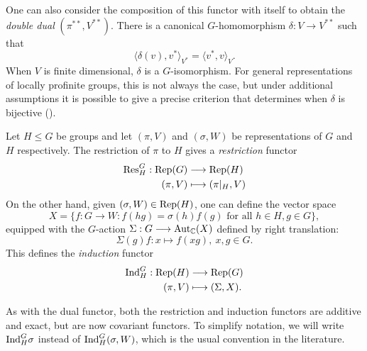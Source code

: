 One can also consider the composition of this functor with itself to obtain the \textit{double dual} $(\pi^{**},V^{**})$. There is a canonical $G$-homomorphism $\delta:V\rightarrow V^{**}$ such that $$\langle\delta(v),v^*\rangle_{V^*}=\langle v^*,v\rangle_{V}.$$
When $V$ is finite dimensional, $\delta$ is a $G$-isomorphism. For general representations of locally profinite groups, this is not always the case, but under additional assumptions it is possible to give a precise criterion that determines when $\delta$ is bijective (\cite[Corollary 2.8, Proposition 2.9]{BH1}).


\begin{defn}\label{def:absresind}
    Let $H\leq G$ be groups and let $(\pi,V)$ and $(\sigma,W)$ be representations of $G$ and $H$ respectively. The restriction of $\pi$ to $H$ gives a \textit{restriction} functor
    \begin{align*}
        \mathrm{Res}_H^G:\mathrm{Rep}(G)&\longrightarrow\mathrm{Rep}(H)\\
        (\pi,V)&\longmapsto(\pi|_H,V)
    \end{align*}
    On the other hand, given $(\sigma,W)\in\mathrm{Rep}(H)$, one can define the vector space
    $$X=\{f:G\to W:f(hg)=\sigma(h)f(g)\text{ for all }h\in H, g\in G\},$$
    equipped with the $G$-action $\Sigma:G\longrightarrow\mathrm{Aut}_{\mathbb{C}}(X)$ defined by right translation:
    $$\Sigma(g)f:x\longmapsto f(xg),\ x,g\in G.$$
    This defines the \textit{induction} functor
    \begin{align*}
        \mathrm{Ind}_H^G:\mathrm{Rep}(H)&\longrightarrow\mathrm{Rep}(G)\\
        (\pi,V)&\longmapsto(\Sigma,X).
    \end{align*}
\end{defn}

As with the dual functor, both the restriction and induction functors are additive and exact, but are now covariant functors. To simplify notation, we will write $\mathrm{Ind}_H^G\sigma$ instead of $\mathrm{Ind}_H^G(\sigma,W)$, which is the usual convention in the literature.

